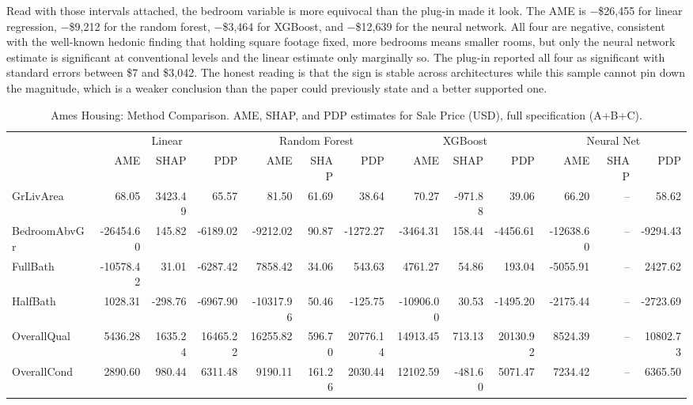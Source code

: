 \documentclass[12pt]{article}
\begin{document}
	Read with those intervals attached, the bedroom variable is more equivocal than the plug-in made it look. The AME is $-$\$26,455 for linear regression, $-$\$9,212 for the random forest, $-$\$3,464 for XGBoost, and $-$\$12,639 for the neural network. All four are negative, consistent with the well-known hedonic finding that holding square footage fixed, more bedrooms means smaller rooms, but only the neural network estimate is significant at conventional levels and the linear estimate only marginally so. The plug-in reported all four as significant with standard errors between \$7 and \$3,042. The honest reading is that the sign is stable across architectures while this sample cannot pin down the magnitude, which is a weaker conclusion than the paper could previously state and a better supported one.
	
	\begin{table}
		\centering
		\small
		\begin{threeparttable}
			\caption{Ames Housing: Method Comparison. AME, SHAP, and PDP estimates for Sale Price (USD), full specification (A+B+C).}
			\label{tab:ames_housing_method_comparison}
			\begin{tabular}{lrrrrrrrrrrrr}
				\toprule
				& \multicolumn{3}{c}{Linear} & \multicolumn{3}{c}{Random Forest} & \multicolumn{3}{c}{XGBoost} & \multicolumn{3}{c}{Neural Net} \\
				\cmidrule(lr){2-4} \cmidrule(lr){5-7} \cmidrule(lr){8-10} \cmidrule(lr){11-13}
				& AME & SHAP & PDP & AME & SHAP & PDP & AME & SHAP & PDP & AME & SHAP & PDP \\
				\midrule
				GrLivArea & 68.05 & 3423.49 & 65.57 & 81.50 & 61.69 & 38.64 & 70.27 & -971.88 & 39.06 & 66.20 & -- & 58.62 \\
				BedroomAbvGr & -26454.60 & 145.82 & -6189.02 & -9212.02 & 90.87 & -1272.27 & -3464.31 & 158.44 & -4456.61 & -12638.60 & -- & -9294.43 \\
				FullBath & -10578.42 & 31.01 & -6287.42 & 7858.42 & 34.06 & 543.63 & 4761.27 & 54.86 & 193.04 & -5055.91 & -- & 2427.62 \\
				HalfBath & 1028.31 & -298.76 & -6967.90 & -10317.96 & 50.46 & -125.75 & -10906.00 & 30.53 & -1495.20 & -2175.44 & -- & -2723.69 \\
				\midrule
				OverallQual & 5436.28 & 1635.24 & 16465.22 & 16255.82 & 596.70 & 20776.14 & 14913.45 & 713.13 & 20130.92 & 8524.39 & -- & 10802.73 \\
				OverallCond & 2890.60 & 980.44 & 6311.48 & 9190.11 & 161.26 & 2030.44 & 12102.59 & -481.60 & 5071.47 & 7234.42 & -- & 6365.50 \\

\end{tabular}
\end{threeparttable}
\end{table}
\end{document}

